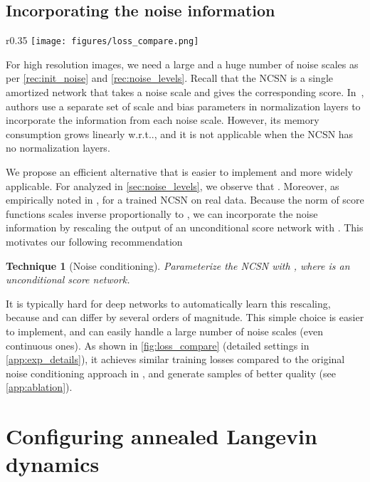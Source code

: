 \documentclass{article}
\makeatletter
\newtheorem{recipe}{Technique}
\def\@onedot{\ifx\@let@token.\else.\null\fi\xspace}
\DeclareRobustCommand\onedot{\futurelet\@let@token\@onedot}
\def\wrt{w.r.t\onedot}
\makeatother
\begin{document}
\subsection{Incorporating the noise information}\label{sec:cond}
\begin{wrapfigure}[11]{r}{0.35\textwidth}
    \centering
    \vspace{-1.8em}
    \hspace{-1em}\texttt{[image: figures/loss\_compare.png]}
    \caption{Training loss curves of two noise conditioning methods. }
    \label{fig:loss_compare}
\end{wrapfigure}
For high resolution images, we need a large  and a huge number of noise scales as per \cref{rec:init_noise} and \ref{rec:noise_levels}. Recall that the NCSN is a single amortized network that takes a noise scale and gives the corresponding score.
In~\cite{song2019generative}, authors use a separate set of scale and bias parameters in normalization layers to incorporate the information from each noise scale. However, its memory consumption grows linearly \wrt , and it is not applicable when the NCSN has no normalization layers.

We propose an efficient alternative that is easier to implement and more widely applicable. For  analyzed in \cref{sec:noise_levels}, we observe that . Moreover, as empirically noted in \cite{song2019generative},  for a trained NCSN on real data. Because the norm of score functions scales inverse proportionally to , we can incorporate the noise information by rescaling the output of an unconditional score network  with . This motivates our following recommendation 
\begin{recipe}[Noise conditioning]\label{rec:cond}
Parameterize the NCSN with , where  is an unconditional score network.
\end{recipe}It is typically hard for deep networks to automatically learn this rescaling, because  and  can differ by several orders of magnitude. This simple choice is easier to implement, and can easily handle a large number of noise scales (even continuous ones). As shown in \cref{fig:loss_compare} (detailed settings in \cref{app:exp_details}), it achieves similar training losses compared to the original noise conditioning approach in \cite{song2019generative}, and generate samples of better quality (see \cref{app:ablation}).

\section{Configuring annealed Langevin dynamics}
\end{document}
